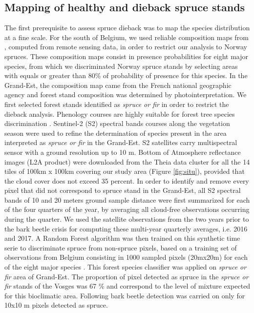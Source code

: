 \documentclass[3p,procedia]{elsarticle}
\begin{document}
\subsection{Mapping of healthy and dieback spruce stands}
The first prerequisite to assess spruce dieback was to map the species distribution at a fine scale.
For the south of Belgium, we used reliable composition maps from \cite{bolyn_mapping_2022}, computed from remote sensing data, in order to restrict our analysis to Norway spruces. 
These composition maps consist in presence probabilities for eight major species, from which we discriminated Norway spruce stands by selecting areas with equals or greater than 80\% of probability of presence for this species.  
In the Grand-Est, the composition map came from the French national geographic agency \citep{IGN_bd_2018} and forest stand composition was determined by photointerpretation.
We first selected forest stands identified as \textit{spruce or fir} in order to restrict the dieback analysis. 
Phenology courses are highly suitable for forest tree species discrimination \citep{lisein_discrimination_2015,grabska_forest_2019,ma_tree_2021}.
Sentinel-2 (S2) spectral bands courses along the vegetation season were used to refine the determination of species present in the area interpreted as \textit{spruce or fir} in the Grand-Est. 
S2 satellites carry multispectral sensor with a ground resolution up to 10 m. 
Bottom of Atmosphere reflectance images (L2A product) were downloaded from the Theia data cluster \citep{theia_team} for all the 14 tiles of 100km x 100km covering our study area (Figure \ref{fig:situ}), provided that the cloud cover does not exceed 35 percent.
In order to identify and remove every pixel that did not correspond to spruce stand in the Grand-Est, all S2 spectral bands of 10 and 20 meters ground sample distance were first summarized for each of the four quarters of the year, by averaging all cloud-free observations occurring during the quarter.
We used the satellite observations from the two years prior to the bark beetle crisis for computing these multi-year quarterly averages, i.e. 2016 and 2017.
A Random Forest algorithm was then trained on this synthetic time serie to discriminate spruce from non-spruce pixels, based on a training set of observations from Belgium consisting in 1000 sampled pixels (20mx20m) for each of the eight major species \citep{bolyn_forest_2018}.
This forest species classifier was applied on \textit{spruce or fir} area of Grand-Est. 
The proportion of pixel detected as spruce in the \textit{spruce or fir} stands of the Vosges was 67 \% and correspond to the level of mixture expected for this bioclimatic area.  
Following bark beetle detection was carried on only for 10x10 m pixels detected as spruce.
\end{document}
